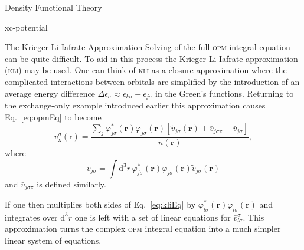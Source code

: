 \documentclass[a5paper, 9 pt]{extreport}
\begin{document}
\begin{chapter}{Density Functional Theory \label{chap:dft}}
\begin{section}{xc-potential \label{sec:xcpot}}
\begin{subsection}{The Krieger-Li-Iafrate Approximation \label{sec:kli}}
         Solving of the full \textsc{opm} integral equation can be quite difficult. To aid in this
         process the Krieger-Li-Iafrate approximation~\cite{kli1} (\textsc{kli}) may be used. One can
         think of \textsc{kli} as a closure approximation where the complicated interactions between
         orbitals are simplified by the introduction of an average energy difference
         $\Delta \epsilon_\sigma \approx \epsilon_{k \sigma} - \epsilon_{j \sigma}$ in the Green's
         functions. Returning to the exchange-only example introduced earlier this approximation causes
         Eq.~\eqref{eq:opmEq} to become
         \begin{equation} \label{eq:kliEq}
            v_\mathrm{x}^\sigma(\mathrm{r}) =
               \frac{\sum\limits_{j} \varphi^*_{j \sigma} (\mathbf{r}) \varphi_{j \sigma} (\mathbf{r})
               \left[ \tilde{v}_{j \sigma}(\mathbf{r}) + \bar{v}_{j \sigma \mathrm{x}}
                                               - \bar{v}_{j \sigma} \right]}{n(\mathbf{r})},
         \end{equation}
         where
         \begin{equation}
            \bar{v}_{j \sigma} = \int \mathrm{d}^3 r \, \varphi^*_{j \sigma} (\mathbf{r})
               \varphi_{j \sigma} (\mathbf{r}) \tilde{v}_{j \sigma} (\mathbf{r})
         \end{equation}
         and $\bar{v}_{j \sigma \mathrm{x}}$ is defined similarly.

         If one then multiplies both sides of Eq.~\eqref{eq:kliEq} by $\varphi^*_{l \sigma} (\mathbf{r})
         \varphi_{l \sigma} (\mathbf{r})$ and integrates over $\mathrm{d}^3 r$ one is left with a set of
         linear equations for $\bar{v}^\sigma_{l \sigma}$. This approximation turns the complex
         \textsc{opm} integral equation into a much simpler linear system of equations.


\end{subsection}
\end{section}
\end{chapter}
\end{document}
